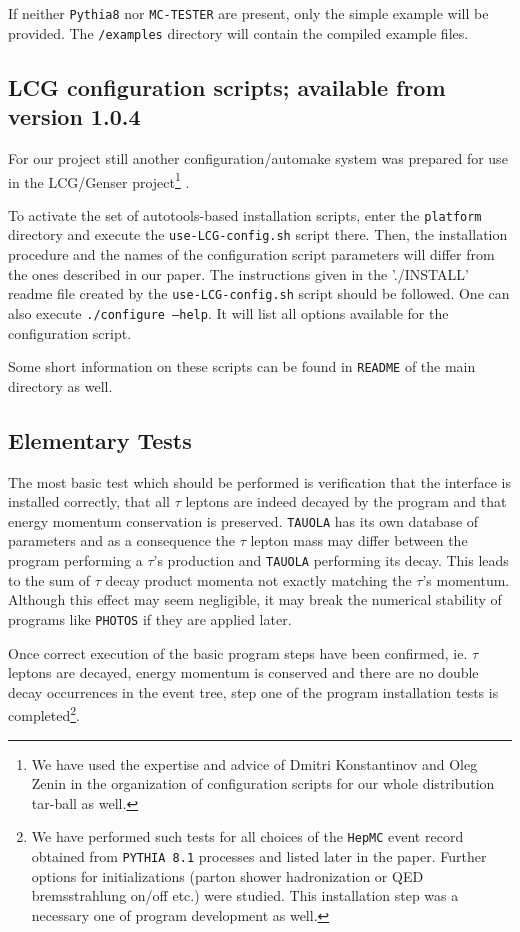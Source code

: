 \documentclass[]{Tauola_interface_design}
\begin{document}
If neither {\tt Pythia8} nor {\tt MC-TESTER} are present, only the simple example will be provided. The {\tt /examples} directory will contain the compiled example files.

\subsection{ LCG configuration scripts; available from version 1.0.4  }
\label{sec:autotools}

For our project still another configuration/automake system was
prepared for use in the LCG/Genser project\footnote{We have used the expertise and advice
of Dmitri Konstantinov and Oleg Zenin in the organization of configuration scripts
for our whole distribution tar-ball as well.} \cite{LCG,Kirsanov:2008zz}.

To activate the set of autotools\cite{autotools}-based installation scripts,
enter the {\tt platform} directory and execute the {\tt use-LCG-config.sh} script there.
Then, the installation procedure and the names of the configuration script parameters will differ from the ones 
described in our paper. The instructions given in the './INSTALL' readme file created by the {\tt use-LCG-config.sh} script
should be followed. One can also execute {\tt ./configure --help}. It will 
list all options available for the configuration script.

Some short information on these scripts can be found in {\tt README} of the main directory as well.

\subsection{Elementary Tests}
\label{sect:elem}
The most basic test which should be performed is verification that the interface is installed correctly, that all
$\tau$ leptons are indeed decayed by the program and that energy 
momentum conservation is preserved. {\tt TAUOLA} has its own database of parameters
and as a consequence the $\tau$ lepton mass may differ between the 
program performing a $\tau$'s production and {\tt TAUOLA} performing its decay. This leads to the sum of 
$\tau$ decay product momenta not exactly matching the $\tau$'s momentum. Although
this effect may seem negligible, it may break the numerical stability of 
programs like {\tt PHOTOS} if they are applied later.

Once correct execution of the basic program steps have been confirmed, ie. $\tau$ leptons are 
decayed, energy momentum is conserved and there are no double 
decay occurrences in the event tree, step one of the program installation tests 
 is completed\footnote{
We have  performed such  tests for all choices of the {\tt HepMC} event record obtained 
from  {\tt PYTHIA 8.1} processes and 
listed later in the paper. Further  options for initializations 
(parton shower hadronization or QED bremsstrahlung on/off etc.) were studied.
This installation step  was a necessary one of program development as well.}.
\end{document}
